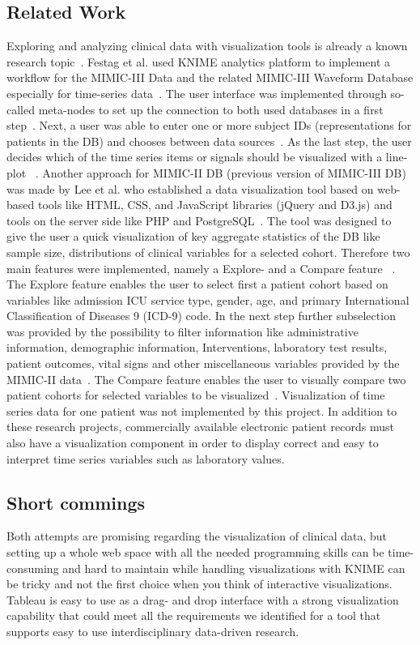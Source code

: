 \documentclass[aac,crcready]{iosart2x}
\begin{document}
\subsection{Related Work}
Exploring and analyzing clinical data with visualization tools is already a known research topic~\cite{Caban.2015, Sittig.2015, UnberathPhilipp.2019, Festag.2019}. Festag et al. used KNIME analytics platform to implement a workflow for the MIMIC-III Data and the related MIMIC-III Waveform Database especially for time-series data~\cite{Festag.2019}. The user interface was implemented through so-called meta-nodes to set up the connection to both used databases in a first step~\cite{Festag.2019}. Next, a user was able to enter one or more subject IDs (representations for patients in the DB) and chooses between data sources~\cite{Festag.2019}. As the last step, the user decides which of the time series items or signals should be visualized with a line-plot ~\cite{Festag.2019}.
Another approach for MIMIC-II DB (previous version of MIMIC-III DB) was made by Lee et al. who established a data visualization tool based on web-based tools like HTML, CSS, and JavaScript libraries (jQuery and D3.js) and tools on the server side like PHP and PostgreSQL~\cite{Lee.2016}. The tool was designed to give the user a quick visualization of key aggregate statistics of the DB like sample size, distributions of clinical variables for a selected cohort. Therefore two main features were implemented, namely a Explore- and a Compare feature ~\cite{Lee.2016}. The Explore feature enables the user to select first a patient cohort based on variables like admission ICU service type, gender, age, and primary International Classification of Diseases 9 (ICD-9) code. In the next step further subselection was provided by the possibility to filter information like administrative information, demographic information, Interventions, laboratory test results, patient outcomes, vital signs and other miscellaneous variables provided by the MIMIC-II data~\cite{Lee.2016}. The Compare feature enables the user to visually compare two patient cohorts for
selected variables to be visualized~\cite{Lee.2016}. Visualization of time series data for one patient was not implemented by this project. In addition to these research projects, commercially available electronic patient records must also have a visualization component in order to display correct and easy to interpret time series variables such as laboratory values. 


\subsection{Short commings}
Both attempts are promising regarding the visualization of clinical data, but setting up a whole web space with all the needed programming skills can be time-consuming and hard to maintain while handling visualizations with KNIME can be tricky and not the first choice when you think of interactive visualizations. Tableau is easy to use as a drag- and drop interface with a strong visualization capability that could meet all the requirements we identified for a tool that supports easy to use interdisciplinary data-driven research.
 
\end{document}
